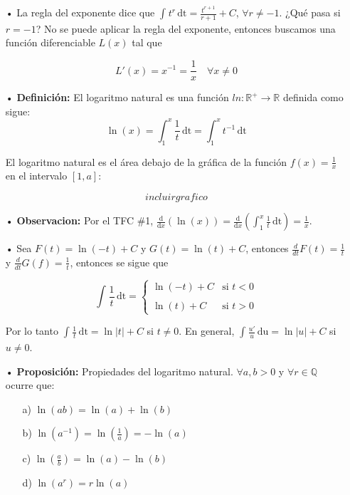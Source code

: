 \documentclass[pts12]{article}
\numberwithin{equation}{section}
\newcommand{\Col}{\color{ProcessBlue}}
\newcommand{\xinteg}[4]{\int_{#1}^{#2} \! {#3} \, \mathrm{#4}}
\newcommand{\derivate}[2]{\frac{\mathrm{d}}{\mathrm{d}#1} \left(  {#2}  \right)  }
\begin{document}
\begin{itemize}
\item[\Col •] La regla del exponente dice que $\int_{}^{} \! {t^r} \, \mathrm{dt}=\frac{t^{r+1}}{r+1}+C$, $\forall r\neq -1$. ¿Qué pasa si $r=-1$? No se puede aplicar la regla del exponente, entonces buscamos una función diferenciable $L(x)$ tal que 

$$ L'(x)=x^{-1}=\frac{1}{x} \quad \forall x\neq 0 $$

\item[\Col •] \textbf{Definición:} El logaritmo natural es una función $ln:\mathbb{R^+}\longrightarrow\mathbb{R}$ definida como sigue:
$$ \ln(x)=\xinteg{1}{x}{\frac{1}{t}}{dt}=\xinteg{1}{x}{t^{-1}}{dt}$$ 

El logaritmo natural es el área debajo de la gráfica de la función $f(x)=\frac{1}{x}$ en el intervalo $[1,a]$:

$$ incluirgrafico $$ 

\item[\Col •] \textbf{Observacion:} Por el TFC \#1, $\derivate{x}{\ln(x)}=   \derivate{x}{\xinteg{1}{x}{\frac{1}{t}}{dt}}=\frac{1}{x}$.

\item[\Col •] Sea $F(t)=\ln(-t)+C$ y $G(t)=\ln(t)+C$, entonces $\frac{d}{dt}F(t)=\frac{1}{t}$ y $\frac{d}{dt}G(f)=\frac{1}{t}$, entonces se sigue que 

$$ \xinteg{}{}{\frac{1}{t}}{dt}= \left\{
    \begin{array}{ll}
        \ln(-t)+C  & \mbox{si } t<0 \\
        \\ \ln(t)+C & \mbox{si } t>0
    \end{array}
\right.$$

Por lo tanto $\xinteg{}{}{\frac{1}{t}}{dt}=\ln|t|+C$ si $t\neq 0$. En general, $\xinteg{}{}{\frac{u'}{u}}{du}=\ln|u|+C$ si $u\neq 0$.

\item[\Col •] \textbf{Proposición:} Propiedades del logaritmo natural. $\forall a,b>0$ y $\forall r\in\mathbb{Q}$ ocurre que:
\begin{enumerate}
\item[a)] $\ln(ab)=\ln(a)+\ln(b)$
\item[b)] $\ln(a^{-1})=\ln\left(\frac{1}{a}\right)=-\ln(a)$
\item[c)] $\ln\left(\frac{a}{b}\right)=\ln(a)-\ln(b)$
\item[d)] $\ln(a^r)=r\ln(a)$
\end{enumerate}


\end{itemize}
\end{document}
